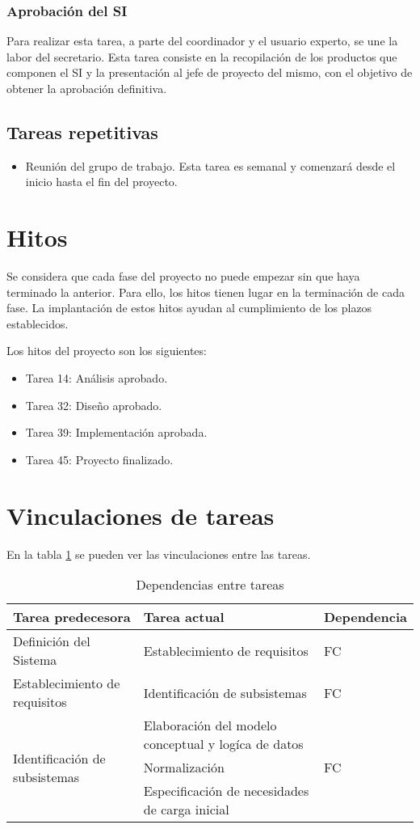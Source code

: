 \documentclass[11pt,a4paper,spanish,twoside]{book}
\begin{document}
\subsubsection{Aprobación del SI}
Para realizar esta tarea, a parte del coordinador y el usuario experto, se une 
la labor del secretario. Esta tarea consiste en la recopilación de los 
productos que componen el SI y la presentación al jefe de proyecto del mismo, 
con el objetivo de obtener la aprobación definitiva.

\subsection{Tareas repetitivas}
  \begin{itemize}
  \item Reunión del grupo de trabajo. Esta tarea es semanal y comenzará desde
    el inicio hasta el fin del proyecto.
  \end{itemize}

\section{Hitos}
Se considera que cada fase del proyecto no puede empezar sin que haya
terminado la anterior. Para ello, los hitos tienen lugar en la terminación de
cada fase. La implantación de estos hitos ayudan al cumplimiento de los
plazos establecidos.

Los hitos del proyecto son los siguientes:
\begin{itemize}
\item Tarea 14: Análisis aprobado.
\item Tarea 32: Diseño aprobado.
\item Tarea 39: Implementación aprobada.
\item Tarea 45: Proyecto finalizado.
\end{itemize}

\section{Vinculaciones de tareas}
En la tabla \ref{Tab:Dep} se pueden ver las vinculaciones entre las tareas.
\begin{table}[!h]
  \centering
  \small
  \begin{tabular}{l|p{5cm}|l}
    \textbf{Tarea predecesora} & \textbf{Tarea actual} & \textbf{Dependencia}\\
    \hline
    Definición del Sistema & Establecimiento de requisitos & FC \\
    \hline
    Establecimiento de requisitos & Identificación de subsistemas & FC \\
    \hline
    \multirow{3}{*}{Identificación de subsistemas} & Elaboración del modelo
    conceptual y logíca de datos & \multirow{3}{*}{FC} \\
    & Normalización \\
    & Especificación de necesidades de carga inicial \\
  \end{tabular}
  \caption{Dependencias entre tareas} \label{Tab:Dep}
\end{table}
\end{document}
